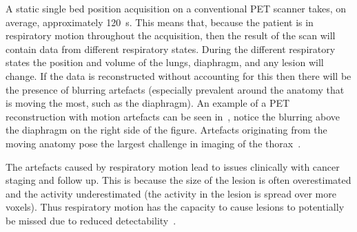             A static single bed position acquisition on a conventional \gls{PET} scanner takes, on average, approximately \SI{120}{\second}. This means that, because the patient is in respiratory motion throughout the acquisition, then the result of the scan will contain data from different respiratory states. During the different respiratory states the position and volume of the lungs, diaphragm, and any lesion will change. If the data is reconstructed without accounting for this then there will be the presence of blurring artefacts (especially prevalent around the anatomy that is moving the most, such as the diaphragm). %
            An example of a \gls{PET} reconstruction with motion artefacts can be seen in~, notice the blurring above the diaphragm on the right side of the figure. Artefacts originating from the moving anatomy pose the largest challenge in imaging of the thorax~\parencite{LungMotionArtefactBib, PETCTArtifactBib}.
            
            The artefacts caused by respiratory motion lead to issues clinically with cancer staging and follow up. This is because the size of the lesion is often overestimated and the activity underestimated (the activity in the lesion is spread over more voxels). Thus respiratory motion has the capacity to cause lesions to potentially be missed due to reduced detectability~\parencite{LungMotionJudgmentErrorsBib}. %
            
